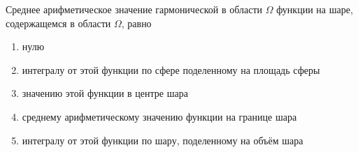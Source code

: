 Среднее арифметическое значение гармонической в области \(\Omega\) функции на шаре, содержащемся в области \(\Omega\), равно

\begin{enumerate}[label=\arabic*)]
    \item нулю
    \item интегралу от этой функции по сфере поделенному на площадь сферы
    \item значению этой функции в центре шара
    \item среднему арифметическому значению функции на границе шара
    \item интегралу от этой функции по шару, поделенному на объём шара
\end{enumerate}


